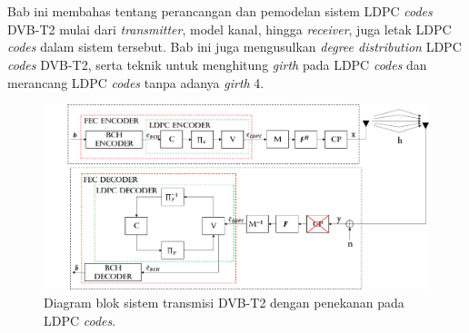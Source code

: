 \chapter{\babTiga}
Bab ini membahas tentang perancangan dan pemodelan sistem LDPC \textit{codes} DVB-T2 mulai dari \textit{transmitter}, model kanal, hingga \textit{receiver}, juga letak LDPC \textit{codes} dalam sistem tersebut. Bab ini juga mengusulkan \textit{degree distribution} LDPC \textit{codes} DVB-T2, serta teknik untuk menghitung \textit{girth} pada LDPC \textit{codes} dan merancang LDPC \textit{codes} tanpa adanya \textit{girth} 4.

\begin{figure}[tb]
	\includegraphics[scale=0.4]
	{pics/sistemmo.png}
	\caption{Diagram blok sistem transmisi DVB-T2 dengan penekanan pada LDPC \textit{codes}.}
	\label{fig:sistem model}
\end{figure}

